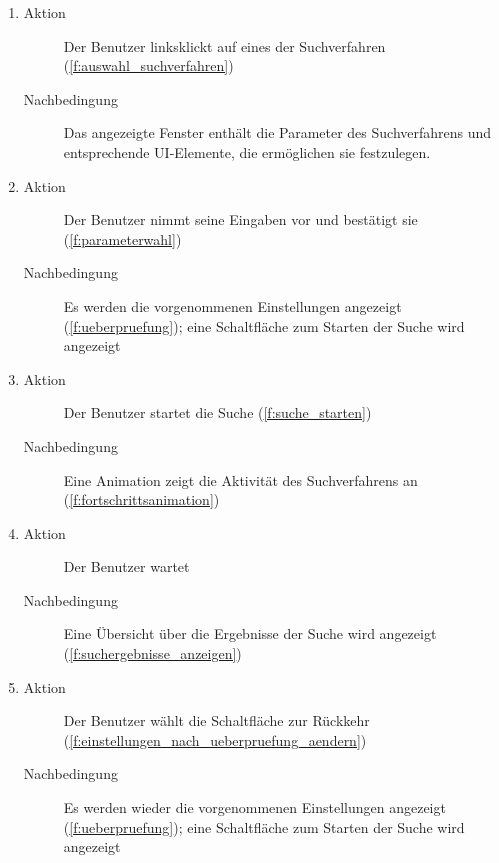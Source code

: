\begin{enumerate} [label=\bfseries /TS \arabic*0/, leftmargin=*]
\begin{enumerate}[leftmargin=0pt, itemindent=0pt]
		\begin{description}
			\item[Aktion] Der Benutzer fährt mit der Maus über ein Suchverfahren
			\item[Nachbedingung] Es wird eine Beschreibung des Suchverfahrens angezeigt (\ref{f:beschreibung_suchverfahren})
		\end{description}
		\item
		\begin{description}
			\item[Aktion] Der Benutzer linksklickt auf eines der Suchverfahren (\ref{f:auswahl_suchverfahren})
			\item[Nachbedingung] Das angezeigte Fenster enthält die Parameter des Suchverfahrens und entsprechende UI-Elemente, die ermöglichen sie festzulegen.
		\end{description}
		\item
		\begin{description}
			\item[Aktion] Der Benutzer nimmt seine Eingaben vor und bestätigt sie (\ref{f:parameterwahl})
			\item[Nachbedingung] Es werden die vorgenommenen Einstellungen angezeigt (\ref{f:ueberpruefung}); eine Schaltfläche zum Starten der Suche wird angezeigt
		\end{description}
		\item
		\begin{description}
			\item[Aktion] Der Benutzer startet die Suche (\ref{f:suche_starten})
			\item[Nachbedingung] Eine Animation zeigt die Aktivität des Suchverfahrens an (\ref{f:fortschrittsanimation})
		\end{description}
		\item
		\begin{description}
			\item[Aktion] Der Benutzer wartet
			\item[Nachbedingung] Eine Übersicht über die Ergebnisse der Suche wird angezeigt (\ref{f:suchergebnisse_anzeigen})
		\end{description}
		\item
		\begin{description}
			\item[Aktion] Der Benutzer wählt die Schaltfläche zur Rückkehr (\ref{f:einstellungen_nach_ueberpruefung_aendern})
			\item[Nachbedingung] Es werden wieder die vorgenommenen Einstellungen angezeigt (\ref{f:ueberpruefung}); eine Schaltfläche zum Starten der Suche wird angezeigt

\end{description}
\end{enumerate}
\end{enumerate}
